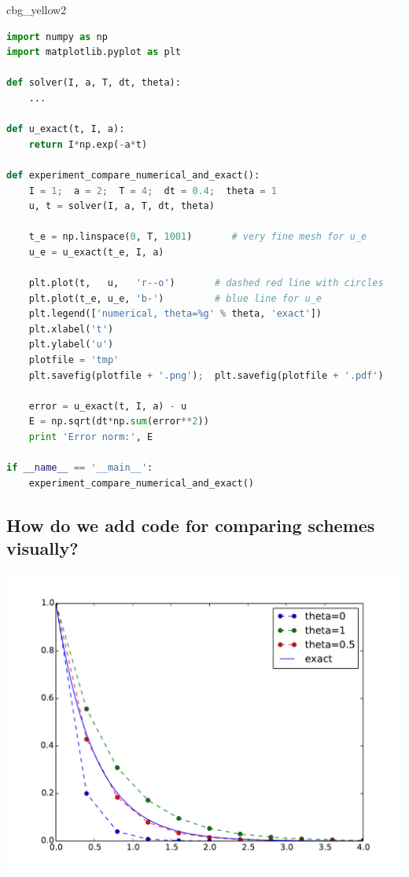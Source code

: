 \documentclass[%
oneside,                 %
final,                   %
10pt]{article}
\newenvironment{_cod_tight}[1]{
   \def\FrameCommand{\colorbox{#1}}
   \FrameRule0.6pt\MakeFramed {\FrameRestore}\vskip3mm}
   {\vskip0mm\endMakeFramed}
\newenvironment{cod}[1]{
\bgroup\rmfamily
\fboxsep=0mm\relax
\begin{_cod_tight}{#1}
\list{}{\parsep=-2mm\parskip=0mm\topsep=0pt\leftmargin=2mm
\rightmargin=2\leftmargin\leftmargin=4pt\relax}
\item\relax}
{\endlist\end{_cod_tight}\egroup}
\begin{document}
\begin{cod}{cbg_yellow2}\begin{lstlisting}[language=Python,style=simple,xleftmargin=2mm]
import numpy as np
import matplotlib.pyplot as plt

def solver(I, a, T, dt, theta):
    ...

def u_exact(t, I, a):
    return I*np.exp(-a*t)

def experiment_compare_numerical_and_exact():
    I = 1;  a = 2;  T = 4;  dt = 0.4;  theta = 1
    u, t = solver(I, a, T, dt, theta)

    t_e = np.linspace(0, T, 1001)       # very fine mesh for u_e
    u_e = u_exact(t_e, I, a)

    plt.plot(t,   u,   'r--o')       # dashed red line with circles
    plt.plot(t_e, u_e, 'b-')         # blue line for u_e
    plt.legend(['numerical, theta=%g' % theta, 'exact'])
    plt.xlabel('t')
    plt.ylabel('u')
    plotfile = 'tmp'
    plt.savefig(plotfile + '.png');  plt.savefig(plotfile + '.pdf')

    error = u_exact(t, I, a) - u
    E = np.sqrt(dt*np.sum(error**2))
    print 'Error norm:', E

if __name__ == '__main__':
    experiment_compare_numerical_and_exact()
\end{lstlisting}\end{cod}
\noindent

\subsection*{How do we add code for comparing schemes visually?}



\centerline{\includegraphics[width=0.9\linewidth]{fig-softeng/compare.pdf}}
\end{document}
